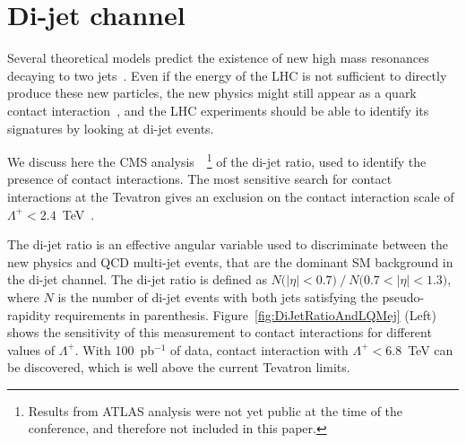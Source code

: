 \documentclass{cmspaper}
\begin{document}
\section{Di-jet channel} \label{dijet}
Several theoretical models predict the existence of new 
high mass resonances decaying to two 
jets~\cite{Baur:1989kv,Bagger:1987fz,Angelopoulos:1986uq}.
Even if the energy of the LHC is not sufficient to directly produce 
these new particles, the new physics might still appear as 
a quark contact interaction~\cite{Eichten:1983hw}, 
and the LHC experiments should 
be able to identify its signatures by looking at di-jet events.

We discuss here the CMS analysis~\cite{DIJETSNOTE}~\footnote{Results 
from ATLAS analysis were not yet public at the time 
of the conference, and therefore not included in this paper.}
of the di-jet ratio, used to identify the presence of contact interactions. 
The most sensitive search for contact interactions at the Tevatron 
gives an exclusion on the contact interaction scale 
of $\Lambda^{+} < 2.4$~TeV~\cite{Abbott:1998wh}.  

The di-jet ratio is an effective angular variable used to 
discriminate between the new physics and QCD multi-jet events, 
that are the dominant SM background in the di-jet channel. The di-jet ratio is 
defined as $N\mbox{(}|\eta|<0.7\mbox{)}~/~N\mbox{(}0.7<|\eta|< 1.3 \mbox{)}$, 
where $N$ is the number of di-jet events with both jets satisfying the 
pseudo-rapidity requirements in parenthesis. 
Figure~\ref{fig:DiJetRatioAndLQMej} (Left) shows the sensitivity of this 
measurement to contact interactions for different values of $\Lambda^{+}$. 
With 100~pb$^{-1}$ of data, contact interaction with
$\Lambda^{+} < 6.8$~TeV can be discovered, which is well above the 
current Tevatron limits.
 
\end{document}
